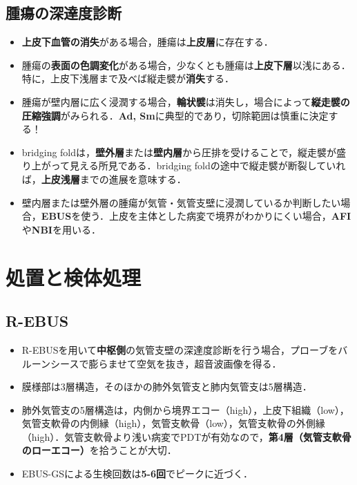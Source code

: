 \subsection{腫瘍の深達度診断}
\begin{itemize}


\item \textbf{上皮下血管の消失}がある場合，腫瘍は\textbf{上皮層}に存在する．
\item 腫瘍の\textbf{表面の色調変化}がある場合，少なくとも腫瘍は\textbf{上皮下層}以浅にある．特に，上皮下浅層まで及べば縦走襞が\textbf{消失}する．
\item 腫瘍が壁内層に広く浸潤する場合，\textbf{輪状襞}は消失し，場合によって\textbf{縦走襞の圧縮強調}がみられる．\textbf{Ad, Sm}に典型的であり，切除範囲は慎重に決定する！

\item bridging foldは，\textbf{壁外層}または\textbf{壁内層}から圧排を受けることで，縦走襞が盛り上がって見える所見である．bridging foldの途中で縦走襞が断裂していれば，\textbf{上皮浅層}までの進展を意味する．

\item 壁内層または壁外層の腫瘍が気管・気管支壁に浸潤しているか判断したい場合，\textbf{EBUS}を使う．上皮を主体とした病変で境界がわかりにくい場合，\textbf{AFI}や\textbf{NBI}を用いる．


\end{itemize}

\section{処置と検体処理}
\subsection{R-EBUS}

\begin{itemize}
\item R-EBUSを用いて\textbf{中枢側}の気管支壁の深達度診断を行う場合，プローブをバルーンシースで膨らませて空気を抜き，超音波画像を得る．
\item 膜様部は3層構造，そのほかの肺外気管支と肺内気管支は5層構造．
\item 肺外気管支の5層構造は，内側から境界エコー（high），上皮下組織（low），気管支軟骨の内側縁（high），気管支軟骨（low），気管支軟骨の外側縁（high）．気管支軟骨より浅い病変でPDTが有効なので，\textbf{第4層（気管支軟骨のローエコー）}を拾うことが大切．
\item EBUS-GSによる生検回数は\textbf{5-6回}でピークに近づく．
\end{itemize}

